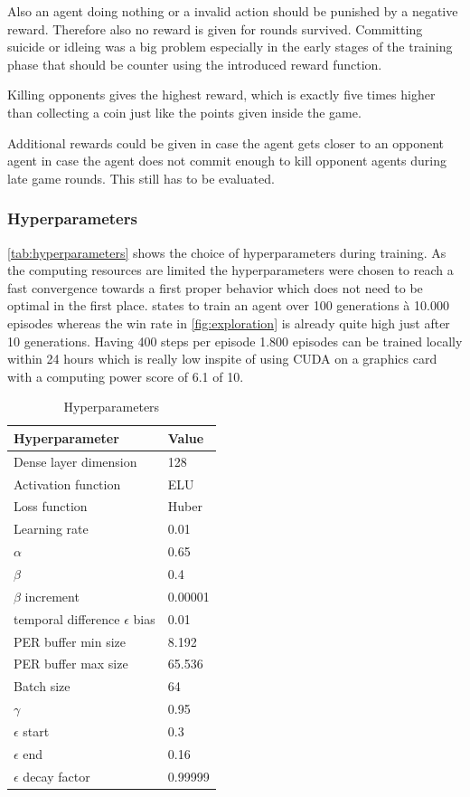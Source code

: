 Also an agent doing nothing or a invalid action should be punished by a negative reward. Therefore also no reward is given for rounds survived. Committing suicide or idleing was a big problem especially in the early stages of the training phase that should be counter using the introduced reward function. 

Killing opponents gives the highest reward, which is exactly five times higher than collecting a coin just like the points given inside the game.

Additional rewards could be given in case the agent gets closer to an opponent agent in case the agent does not commit enough to kill opponent agents during late game rounds. This still has to be evaluated.

\subsubsection{Hyperparameters}
\label{ch:approachBe}

\autoref{tab:hyperparameters} shows the choice of hyperparameters during training. As the computing resources are limited the hyperparameters were chosen to reach a fast convergence towards a first proper behavior which does not need to be optimal in the first place. \cite{Kormelink2018} states to train an agent over 100 generations à 10.000 episodes whereas the win rate in \autoref{fig:exploration} is already quite high just after 10 generations. Having 400 steps per episode 1.800 episodes can be trained locally within 24 hours which is really low inspite of using CUDA on a graphics card with a computing power score of 6.1 of 10. 

\begin{table}[hbt!]
	\caption{Hyperparameters}
	\label{tab:hyperparameters}
	\begin{tabular}{|p{}|p{}|}
		\hline
		\textbf{Hyperparameter} & \textbf{Value} \\ \hline
		Dense layer dimension & 128 \\ \hline
		\hline
		Activation function & ELU \\ \hline
		Loss function & Huber \\ \hline
		Learning rate & 0.01 \\ \hline
		\hline
		$\alpha$ & 0.65 \\ \hline
		$\beta$ & 0.4 \\ \hline
		$\beta$ increment & 0.00001 \\ \hline
		temporal difference $\epsilon$ bias & 0.01 \\ \hline
		\hline
		PER buffer min size & 8.192 \\ \hline
		PER buffer max size & 65.536 \\ \hline
		Batch size & 64 \\ \hline
		\hline
		$\gamma$ & 0.95 \\ \hline
		$\epsilon$ start & 0.3 \\ \hline
		$\epsilon$ end & 0.16 \\ \hline
		$\epsilon$ decay factor & 0.99999 \\ \hline
	\end{tabular}
\end{table}

